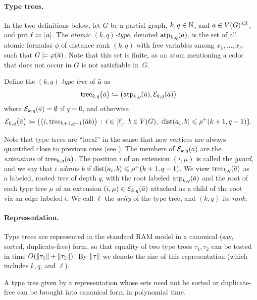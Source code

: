 \paragraph{Type trees.}
In the two definitions below, let $G$ be a partial graph, $k,q\in\mathbb N$, and $\bar a\in V(G)^{\leqslant k}$, and put $\ell\coloneqq|\bar a|$.
The \emph{atomic $(k,q)$-type}, denoted $\textnormal{atp}_{k,q}(\bar a)$, is the set of all atomic formulas $\phi$
of distance rank \((k,q)\)
with free variables among $x_1,\ldots,x_\ell$, such that $G\models\varphi(\bar a)$. Note that this set is finite, as an atom mentioning a color that does not occur in $G$ is not satisfiable in~$G$.

Define the \emph{$(k,q)$-type tree} of $\bar a$ as
\[
\mathrm{tree}_{k,q}\bigl(\bar a\bigr)
\coloneqq
\bigl(\textnormal{atp}_{k,q}(\bar a),\mathcal E_{k,q}(\bar a)\bigr) 
\]
where $\mathcal E_{k,q}(\bar a)=\emptyset$ if $q=0$, and otherwise
\[
\mathcal E_{k,q}\bigl(\tup a\bigr)
\coloneqq
\setof{\bigl(i,\tree_{k+1,q-1}(\tup a b)\bigr)}{i\in[\ell],\ b\in V(G),\ \dist(a_i,b)\le\rhop(k+1,q-1)}.
\]


Note that type trees are ``local'' in the sense that new vertices are always quantified close to previous ones (see ).
The members of $\mathcal E_{k,q}(\bar a)$ are the \emph{extensions} of $\mathrm{tree}_{k,q}(\bar a)$. The position $i$ of an extension $(i,\mu)$ is called the \emph{guard}, and we say that $i$ \emph{admits} $b$ if $\mathrm{dist}(a_i,b)\leqslant\rho^+(k+1,q-1)$.
We view $\mathrm{tree}_{k,q}(\bar a)$ as a labeled, rooted tree
 of depth $q$,
with the root labeled $\textnormal{atp}_{k,q}(\bar a)$ and the root of each type tree $\mu$ of an extension $(i,\mu)\in \mathcal E_{k,q}(\bar a)$ attached as a child of the root via an edge labeled $i$.
We call $\ell$ the \emph{arity} of the type tree, and $(k,q)$ its \emph{rank}.

\paragraph{Representation.}
Type trees are represented in the standard RAM model in a canonical (say, sorted,
duplicate-free) form, so that equality of two type trees $\tau_1,\tau_2$ can be
tested in time $O(\lVert \tau_1\rVert+\lVert \tau_2\rVert)$.
By $\lVert \tau\rVert$ we denote the size of this representation (which includes $k,q$, and $\ell$).


\begin{observation}\label{obs:canonical}
A type tree given by a representation whose sets need not be sorted or duplicate-free can be brought into canonical form in polynomial time.
\end{observation}

